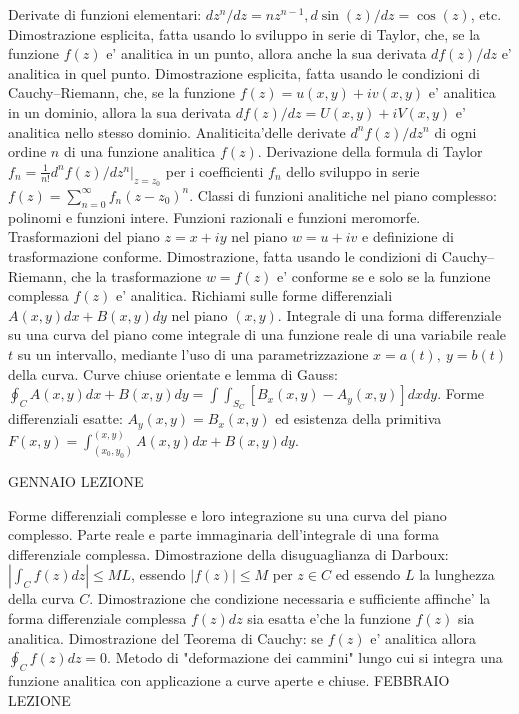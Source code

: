 \documentclass[,12pt]{article}
\begin{document}
\noindent
Derivate di funzioni elementari: $dz^n/dz=nz^{n-1} ,
d\sin(z)/dz=\cos(z)$, etc. Dimostrazione esplicita, fatta usando lo
sviluppo in serie di Taylor, che, se la funzione
$f(z)$ e' analitica in un punto, allora anche la sua derivata $df(z)/dz$
e' analitica in quel punto. Dimostrazione esplicita, fatta usando le
condizioni di Cauchy--Riemann, che, se la funzione $f(z)=u(x,y)+iv(x,y)$
e' analitica in un dominio, allora la sua derivata
$df(z)/dz=U(x,y)+iV(x,y)$ e' analitica nello stesso dominio.
Analiticita'delle derivate
$d^nf(z)/dz^n$ di ogni ordine $n$ di una funzione analitica $f(z)$.
Derivazione della formula di Taylor
$f_n=\frac{1}{n!}d^nf(z)/dz^n|_{z=z_0}$ per i coefficienti $f_n$ dello
sviluppo in serie
$f(z)=\sum_{n=0}^\infty f_n(z-z_0)^n$. Classi di funzioni analitiche
nel piano complesso: polinomi e funzioni intere. Funzioni razionali e
funzioni meromorfe. Trasformazioni del piano $z=x+iy$ nel piano
$w=u+iv$ e definizione di trasformazione conforme. Dimostrazione, fatta
usando le condizioni di Cauchy--Riemann, che la trasformazione $w=f(z)$
e' conforme se e solo se la funzione complessa $f(z)$ e' analitica.
Richiami sulle forme differenziali $A(x,y)dx+B(x,y)dy$ nel piano $(x,y)$.
Integrale di una forma differenziale su una curva del piano come
integrale di una funzione reale di una variabile reale $t$ su un
intervallo, mediante l'uso di una parametrizzazione $x=a(t) ,\ y=b(t)$
della curva. Curve chiuse orientate e lemma di Gauss: $\oint_C
A(x,y)dx+B(x,y)dy=\int \int_{S_C} [B_x(x,y)-A_y(x,y)]dxdy$. Forme
differenziali esatte: $A_y(x,y)=B_x(x,y)$ ed esistenza della primitiva
$F(x,y)=\int_{(x_0,y_0)}^{(x,y)} A(x,y)dx+B(x,y)dy$.   

\vskip 20pt
 GENNAIO
\hskip 20pt
LEZIONE

\noindent
Forme differenziali complesse e loro integrazione su una curva del piano
complesso. Parte reale e parte immaginaria dell'integrale di una forma
differenziale complessa. Dimostrazione della disuguaglianza di Darboux:
$|\int_Cf(z)dz|\leq ML$, essendo $|f(z)|\leq M$ per $z\in C$ ed essendo
 $L$ la lunghezza della curva $C$. Dimostrazione che condizione necessaria
e sufficiente affinche' la forma differenziale complessa $f(z)dz$ sia
esatta e'che la funzione $f(z)$ sia analitica. Dimostrazione del Teorema
di Cauchy: se $f(z)$ e' analitica allora $\oint_C f(z)dz=0$. Metodo di
"deformazione dei cammini" lungo cui si integra una funzione analitica
con applicazione a curve aperte e chiuse.
\vskip 20pt
 FEBBRAIO
\hskip 20pt
LEZIONE
\end{document}
